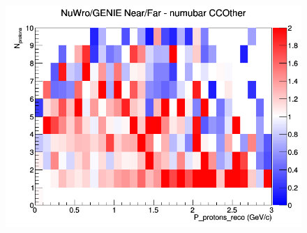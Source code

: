 \begin{figure}[h]
\endminipage
{}
\includegraphics[width=\linewidth]{eff_N_P/LAr/protons/ratios/CCOther_NuWro_GENIE_numubar_NF_N_P.png}
\endminipage
\newline
\end{figure}
\clearpage
